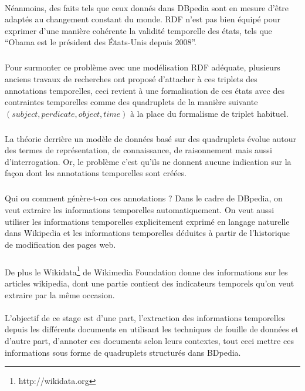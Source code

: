 \paragraph{}
Néanmoins, des faits tels que ceux donnés dans DBpedia sont en mesure d’être adaptés au changement constant du monde.
RDF n’est pas bien équipé pour exprimer d’une manière cohérente la validité temporelle des états, tels que “Obama est le président des États-Unis depuis 2008”. 
\subparagraph{}
Pour surmonter ce problème avec une modélisation RDF adéquate, plusieurs anciens travaux de recherches ont proposé d’attacher à ces triplets des annotations temporelles, ceci revient à une formalisation de ces états avec des contraintes temporelles comme des quadruplets de la manière suivante $(subject, perdicate, object, time)$ à la place du formalisme de triplet habituel.
\subparagraph{}
La théorie derrière un modèle de données basé sur des quadruplets évolue autour des termes de représentation, de connaissance, de raisonnement mais aussi d’interrogation. Or, le problème c’est qu’ils ne donnent aucune indication sur la façon dont les annotations temporelles sont créées.
\subparagraph{}
Qui ou comment génère-t-on ces annotations ?
\newline
Dans le cadre de DBpedia, on veut extraire les informations temporelles automatiquement. On veut aussi utiliser les informations temporelles explicitement exprimé en langage naturelle dans Wikipedia et les informations temporelles déduites à partir de l’historique de modification des pages web.
\subparagraph{}
De plus le Wikidata\footnote{http://wikidata.org} de Wikimedia Foundation donne des informations sur les articles wikipedia, dont une partie contient des indicateurs temporels qu’on veut extraire par la même occasion.
\paragraph{}
L’objectif de ce stage est d’une part, l’extraction des informations temporelles depuis les différents documents en utilisant les techniques de fouille de données et d’autre part, d’annoter ces documents selon leurs contextes, tout ceci mettre ces informations sous forme de quadruplets structurés dans BDpedia.
